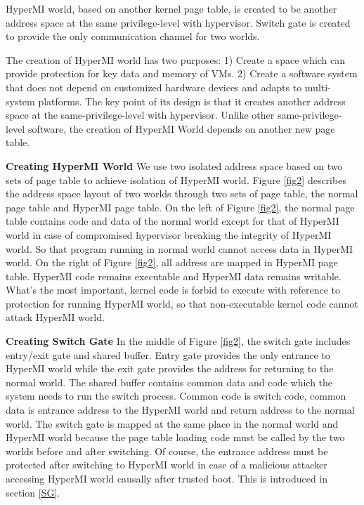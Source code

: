 \documentclass[conference]{IEEEtran}
\begin{document}
HyperMI world, based on another kernel page table, is created to be another address space at the same privilege-level with hypervisor. %
Switch gate is created to provide the only communication channel for two worlds.

The creation of HyperMI world has two purposes: 1) Create a space which can provide protection for key data and memory of VMs. 2) Create a software system that does not depend on customized hardware devices and adapts to multi-system platforms. The key point of its design is that it creates another address space at the same-privilege-level with hypervisor. Unlike other same-privilege-level software, the creation of HyperMI World depends on another new page table.

\textbf{Creating HyperMI World}
 We use two isolated address space based on two sets of page table to achieve isolation of HyperMI world.
Figure \ref{fig2} describes the address space layout of two worlds through two sets of page table, the normal page table and HyperMI page table. On the left of Figure \ref{fig2}, the normal page table contains code and data of the normal world except for that of HyperMI world in case of compromised hypervisor breaking the integrity of HyperMI world. So that program running in normal world cannot access data in HyperMI world. On the right of Figure \ref{fig2}, all address are mapped in HyperMI page table.
HyperMI code remains executable and HyperMI data remains writable. What's the most important, kernel code is forbid to execute with reference to protection for running HyperMI world, so that non-executable kernel code  cannot attack HyperMI world.

\textbf{Creating Switch Gate}
In the middle of Figure \ref{fig2}, the switch gate includes entry/exit gate and shared buffer. Entry gate provides the only entrance to HyperMI world while the exit gate provides the address for returning to the normal world. The shared buffer contains common data and code which the system needs to run the switch process. Common code is switch code, common data is entrance address to the HyperMI world and return address to the normal world. The switch gate is mapped at the same place in the normal world and HyperMI world because the page table loading code must be called by the two worlds before and after switching. Of course, the entrance address must be protected after switching to HyperMI world in case of a malicious attacker accessing HyperMI world causally after trusted boot. This is introduced in section \ref{SG}.
\end{document}

